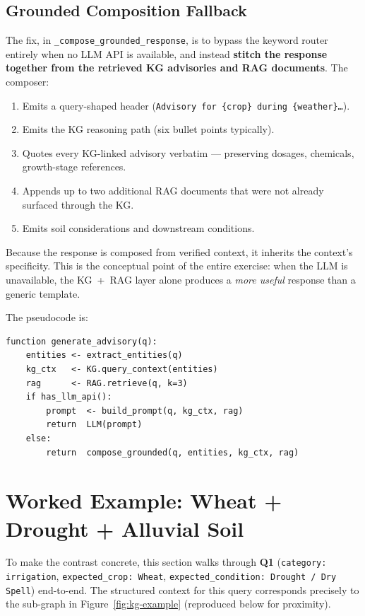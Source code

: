 \documentclass[11pt,a4paper]{article}
\begin{document}
\subsection{Grounded Composition Fallback}\label{sec:grounded-composer}
The fix, in \texttt{\_compose\_grounded\_response}, is to bypass the
keyword router entirely when no LLM API is available, and instead
\textbf{stitch the response together from the retrieved KG advisories
and RAG documents}. The composer:

\begin{enumerate}[leftmargin=*]
  \item Emits a query-shaped header
        (\texttt{Advisory for \{crop\} during \{weather\}\ldots}).
  \item Emits the KG reasoning path (six bullet points typically).
  \item Quotes every KG-linked advisory verbatim --- preserving
        dosages, chemicals, growth-stage references.
  \item Appends up to two additional RAG documents that were not
        already surfaced through the KG.
  \item Emits soil considerations and downstream conditions.
\end{enumerate}

Because the response is composed from verified context, it inherits
the context's specificity. This is the conceptual point of the
entire exercise: when the LLM is unavailable, the KG~+~RAG layer
alone produces a \emph{more useful} response than a generic template.

The pseudocode is:

\begin{lstlisting}
function generate_advisory(q):
    entities <- extract_entities(q)
    kg_ctx   <- KG.query_context(entities)
    rag      <- RAG.retrieve(q, k=3)
    if has_llm_api():
        prompt  <- build_prompt(q, kg_ctx, rag)
        return  LLM(prompt)
    else:
        return  compose_grounded(q, entities, kg_ctx, rag)
\end{lstlisting}

\section{Worked Example: Wheat + Drought + Alluvial Soil}\label{sec:worked}

To make the contrast concrete, this section walks through \textbf{Q1}
(\texttt{category: irrigation}, \texttt{expected\_crop: Wheat},
\texttt{expected\_condition: Drought / Dry Spell}) end-to-end. The
structured context for this query corresponds precisely to the
sub-graph in Figure~\ref{fig:kg-example} (reproduced below for
proximity).
\end{document}
